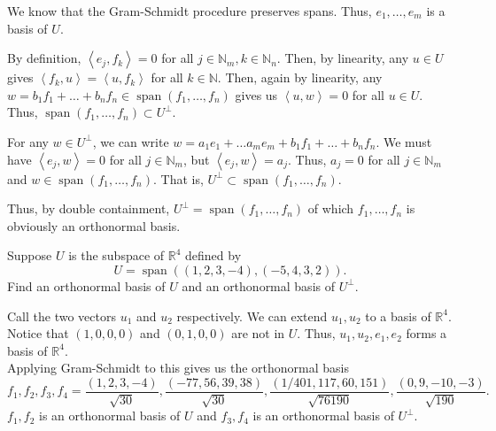 \documentclass[12 pt, letterpaper]{hmcpset}
\begin{document}
\begin{solution}
	We know that the Gram-Schmidt procedure preserves spans. Thus, $e_{1}, \dots, e_{m}$ is a basis of $U$.
	
	By definition, $\left < e_{j}, f_{k} \right > = 0$ for all $j \in \mathbb{N}_{m}, k \in \mathbb{N}_{n}$. Then, by linearity, any $u \in U$ gives $\left < f_{k}, u \right > = \left < u, f_{k} \right >$ for all $k \in \mathbb{N}$. Then, again by linearity, any $w = b_{1} f_{1} + \dots + b_{n} f_{n} \in \operatorname{span}(f_{1}, \dots, f_{n})$ gives us $\left < u, w \right > = 0$ for all $u \in U$. Thus, $\operatorname{span}(f_{1}, \dots, f_{n}) \subset U^{\perp}$.

	For any $w \in U^{\perp}$, we can write $w = a_{1} e_{1} + \dots a_{m} e_{m} + b_{1} f_{1} + \dots + b_{n} f_{n}$. We must have $\left < e_{j}, w \right > = 0$ for all $j \in \mathbb{N}_{m}$, but $\left < e_{j}, w \right > = a_{j}$. Thus, $a_{j} = 0$ for all $j \in \mathbb{N}_{m}$ and $w \in \operatorname{span}(f_{1}, \dots, f_{n})$. That is, $U^{\perp} \subset \operatorname{span}(f_{1}, \dots, f_{n})$.

	Thus, by double containment, $U^{\perp} = \operatorname{span}(f_{1}, \dots, f_{n})$ of which $f_{1}, \dots, f_{n}$ is obviously an orthonormal basis.
\end{solution}

\pagebreak

\begin{problem}[4]
	Suppose $U$ is the subspace of $\mathbb{R}^{4}$ defined by
	 \[
		U = \operatorname{span}((1, 2, 3, -4), (-5, 4, 3, 2)).
	\]
	Find an orthonormal basis of $U$ and an orthonormal basis of $U^{\perp}$.
\end{problem}

\begin{solution}
	Call the two vectors $u_{1}$ and $u_{2}$ respectively. We can extend $u_{1}, u_{2}$ to a basis of $\mathbb{R}^{4}$. Notice that $(1, 0, 0, 0)$ and $(0, 1, 0, 0)$ are not in $U$. Thus, $u_{1}, u_{2}, e_{1}, e_{2}$ forms a basis of $\mathbb{R}^{4}$. \\

	Applying Gram-Schmidt to this gives us the orthonormal basis
	\[
		f_{1}, f_{2}, f_{3}, f_{4} = \frac{(1, 2, 3, -4)}{\sqrt{30}}, \frac{(-77, 56, 39, 38)}{\sqrt{30}}, \frac{(1/401, 117, 60, 151)}{\sqrt{76190}}, \frac{(0, 9, -10, -3)}{\sqrt{190}}.
	\]
	$f_{1}, f_{2}$ is an orthonormal basis of $U$ and $f_{3}, f_{4}$ is an orthonormal basis of $U^{\perp}$.
\end{solution}
\end{document}
